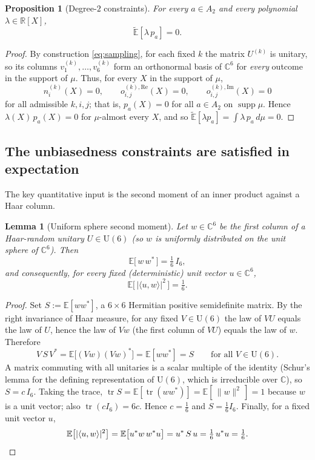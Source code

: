\documentclass{amsart}
\newtheorem{lemma}{Lemma}
\newtheorem{proposition}{Proposition}
\theoremstyle{definition}
\theoremstyle{remark}
\begin{document}
\begin{proposition}[Degree-$2$ constraints]\label{prop:deg2}
For every $a\in A_2$ and every polynomial $\lambda\in\mathbb{R}[X]$,
\[
\widetilde{\mathbb{E}}[\lambda\,p_a]=0 .
\]
\end{proposition}

\begin{proof}
By construction \eqref{eq:sampling}, for each fixed $k$ the matrix $U^{(k)}$ is unitary, so its
columns $v^{(k)}_1,\dots,v^{(k)}_6$ form an orthonormal basis of $\mathbb{C}^6$ for
\emph{every} outcome in the support of $\mu$. Thus, for every $X$ in the support of $\mu$,
\[
n^{(k)}_i(X)=0,\qquad o^{(k),\mathrm{Re}}_{i,j}(X)=0,\qquad o^{(k),\mathrm{Im}}_{i,j}(X)=0
\]
for all admissible $k,i,j$; that is, $p_a(X)=0$ for all $a\in A_2$ on $\operatorname{supp}\mu$.
Hence $\lambda(X)\,p_a(X)=0$ for $\mu$-almost every $X$, and so
$\widetilde{\mathbb{E}}[\lambda p_a]=\int \lambda\,p_a\,d\mu=0$. \qedhere
\end{proof}

\subsection{The unbiasedness constraints are satisfied in expectation}

The key quantitative input is the second moment of an inner product against a Haar column.

\begin{lemma}[Uniform sphere second moment]\label{lem:sphere}
Let $w\in\mathbb{C}^6$ be the first column of a Haar-random unitary $U\in\mathrm{U}(6)$ (so $w$
is uniformly distributed on the unit sphere of $\mathbb{C}^6$). Then
\[
\mathbb{E}\bigl[\,w\,w^{*}\,\bigr]=\tfrac16\,I_6 ,
\]
and consequently, for every fixed (deterministic) unit vector $u\in\mathbb{C}^6$,
\[
\mathbb{E}\bigl[\,|\langle u,w\rangle|^2\,\bigr]=\tfrac16 .
\]
\end{lemma}

\begin{proof}
Set $S:=\mathbb{E}[ww^{*}]$, a $6\times6$ Hermitian positive semidefinite matrix. By the right
invariance of Haar measure, for any fixed $V\in\mathrm{U}(6)$ the law of $VU$ equals the law of
$U$, hence the law of $Vw$ (the first column of $VU$) equals the law of $w$. Therefore
\[
V\,S\,V^{*}=\mathbb{E}\bigl[(Vw)(Vw)^{*}\bigr]=\mathbb{E}[ww^{*}]=S
\qquad\text{for all }V\in\mathrm{U}(6).
\]
A matrix commuting with all unitaries is a scalar multiple of the identity (Schur's lemma for
the defining representation of $\mathrm{U}(6)$, which is irreducible over $\mathbb{C}$), so
$S=c\,I_6$. Taking the trace, $\operatorname{tr}S=\mathbb{E}[\operatorname{tr}(ww^{*})]
=\mathbb{E}[\,\|w\|^2\,]=1$ because $w$ is a unit vector; also $\operatorname{tr}(cI_6)=6c$.
Hence $c=\tfrac16$ and $S=\tfrac16 I_6$. Finally, for a fixed unit vector $u$,
\[
\mathbb{E}\bigl[|\langle u,w\rangle|^2\bigr]
=\mathbb{E}\bigl[u^{*}w\,w^{*}u\bigr]
=u^{*}\,S\,u=\tfrac16\,u^{*}u=\tfrac16. \qedhere
\]
\end{proof}
\end{document}
